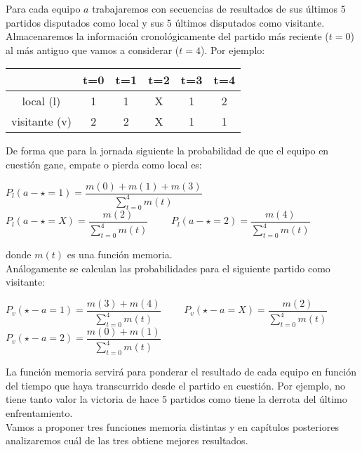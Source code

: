 Para cada equipo $a$ trabajaremos con secuencias de resultados de sus últimos 5 partidos disputados como local y sus 5 últimos disputados como visitante. Almacenaremos la información cronológicamente del partido más reciente ($t=0$) al más antiguo que vamos a considerar ($t=4$). Por ejemplo:
\begin{center}
	\begin{tabular}{|c|c|c|c|c|c|}
	\hline  & t=0 & t=1 & t=2 & t=3 & t=4 \\ 
	\hline local (l)  & 1 & 1 & X & 1 & 2\\ 
	\hline visitante (v) & 2 & 2 & X & 1 & 1\\ 
	\hline 
	\end{tabular} 
\end{center}
De forma que para la jornada siguiente la probabilidad de que el equipo en cuestión gane, empate o pierda como local es:
\begin{center}
$P_{l}(a - \star=1)=\dfrac{m(0)+m(1)+m(3)}{\sum_{t=0}^{4}m(t)}$\\
$P_{l}(a - \star=X)=\dfrac{m(2)}{\sum_{t=0}^{4}m(t)}$ \ \ \ \
$P_{l}(a - \star=2)=\dfrac{m(4)}{\sum_{t=0}^{4}m(t)}$
\end{center}
donde $m(t)$ es una función memoria.\\

Análogamente se calculan las probabilidades para el siguiente partido como visitante:
\begin{center}
	$P_{v}(\star - a=1)=\dfrac{m(3)+m(4)}{\sum_{t=0}^{4}m(t)}$ \ \ \ \
	$P_{v}(\star - a=X)=\dfrac{m(2)}{\sum_{t=0}^{4}m(t)}$\\
	$P_{v}(\star - a=2)=\dfrac{m(0)+m(1)}{\sum_{t=0}^{4}m(t)}$
\end{center}

La función memoria servirá para ponderar el resultado de cada equipo en función del tiempo que haya transcurrido desde el partido en cuestión. Por ejemplo, no tiene tanto valor la victoria de hace 5 partidos como tiene la derrota del último enfrentamiento.\\

Vamos a proponer tres funciones memoria distintas y en capítulos posteriores analizaremos cuál de las tres obtiene mejores resultados. 

\newpage

